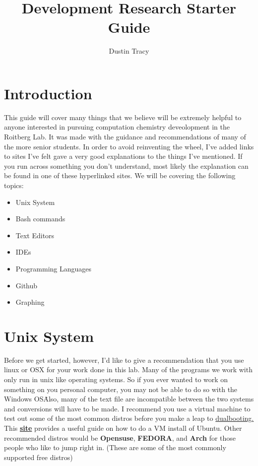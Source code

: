 \documentclass{article}
\begin{document}
\title{Development Research Starter Guide}
\author{Dustin Tracy}
\maketitle

\section*{Introduction}

This guide will cover many things that we believe will be extremely helpful to anyone interested in pursuing computation chemistry deveolopment in the Roitberg Lab. 
It was made with the guidance and recommendations of many of the more senior students. 
In order to avoid reinventing the wheel, I've added links to sites I've felt gave a very good explanations to the things I've mentioned.
If you run across something you don't understand, most likely the explanation can be found in one of these hyperlinked sites.
We will be covering the following topics: \\

\begin{itemize}
\item Unix System
\item Bash commands
\item Text Editors
\item IDEs
\item Programming Languages
\item Github
\item Graphing
\end{itemize}

\section*{Unix System}
Before we get started, however, I'd like to give a recommendation that you use linux or OSX for your work done in this lab. 
Many of the programs we work with only run in unix like operating systems.
So if you ever wanted to work on something on you personal computer, you may not be able to do so with the Windows OS\. 
Also, many of the text file are incompatible between the two systems and conversions will have to be made.
I recommend you use a virtual machine to test out some of the most common distros before you make a leap to \href{https://help.ubuntu.com/community/WindowsDualBoot}{dualbooting.}
This \href{http://henricasanova.github.io/VirtualBoxUbuntuHowTo.html}{\textbf{site}} provides a useful guide on how to do a VM install of Ubuntu.
Other recommended distros would be \textbf{Opensuse}, \textbf{FEDORA}, and \textbf{Arch} for those people who like to jump right in. (These are some of the most commonly supported free distros)
\end{document}
